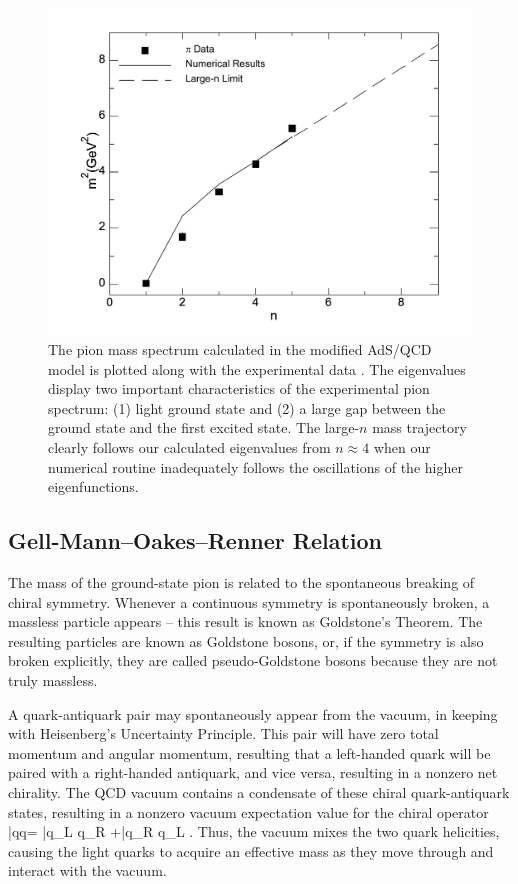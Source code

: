\begin{figure}[htb]
\begin{center}
\includegraphics[scale=0.42]{linear.pdf}
\caption{The pion mass spectrum calculated in the modified AdS/QCD model is plotted along with the experimental data \cite{pdg}. 
The eigenvalues display two important characteristics of the experimental pion spectrum: (1) light ground state and (2) a large gap between the ground state and the first excited state. 
The large-$n$ mass trajectory clearly follows our calculated eigenvalues from $n\approx 4$ when our numerical routine inadequately follows the oscillations of the higher eigenfunctions.}
\label{fig:mass}
\end{center}
\end{figure}

\subsection{Gell-Mann--Oakes--Renner Relation}
The mass of the ground-state pion is related to the spontaneous breaking of chiral symmetry.
Whenever a continuous symmetry is spontaneously broken, a massless particle appears -- this result is known as Goldstone's Theorem.
The resulting particles are known as Goldstone bosons, or, if the symmetry is also broken explicitly, they are called pseudo-Goldstone bosons because they are not truly massless.
 
 A quark-antiquark pair may spontaneously appear from the vacuum, in keeping with Heisenberg's Uncertainty Principle. 
 This pair will have zero total momentum and angular momentum, resulting that a left-handed quark will be paired with a right-handed antiquark, and vice versa, resulting in a nonzero net chirality.
 The QCD vacuum contains a condensate of these chiral quark-antiquark states, resulting in a nonzero vacuum expectation value for the chiral operator
 \be
 \langle\bar{q}q\rangle = \langle \bar{q}_L q_R +\bar{q}_R q_L \rangle {}.
 \ee
 Thus, the vacuum mixes the two quark helicities, causing the light quarks to acquire an effective mass as they move through and interact with the vacuum.
 
